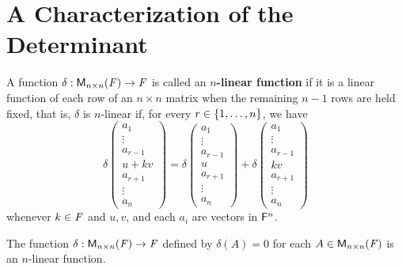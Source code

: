 \section{A Characterization of the Determinant}\label{sec:4.5}

\begin{defn}\label{4.5.1}
  A function \(\delta : \mathsf{M}_{{n} \times n}({\mathit{F}}) \to \mathit{F}\) is called an \textbf{\(n\)-linear function} if it is a linear function of each row of an \(n \times n\) matrix when the remaining \(n - 1\) rows are held fixed, that is, \(\delta\) is \(n\)-linear if, for every \(r \in \left\lbrace1, \dots, n\right\rbrace\), we have
  \[
    \delta\begin{pmatrix}
      a_1       \\
      \vdots    \\
      a_{r - 1} \\
      u + kv    \\
      a_{r + 1} \\
      \vdots    \\
      a_n
    \end{pmatrix} = \delta\begin{pmatrix}
      a_1       \\
      \vdots    \\
      a_{r - 1} \\
      u         \\
      a_{r + 1} \\
      \vdots    \\
      a_n
    \end{pmatrix} + \delta\begin{pmatrix}
      a_1       \\
      \vdots    \\
      a_{r - 1} \\
      kv        \\
      a_{r + 1} \\
      \vdots    \\
      a_n
    \end{pmatrix}
  \]
  whenever \(k \in \mathit{F}\) and \(u, v\), and each \(a_i\) are vectors in \(\mathsf{F}^n\).
\end{defn}

\begin{eg}\label{4.5.2}
  The function \(\delta : \mathsf{M}_{{n} \times n}({\mathit{F}}) \to \mathit{F}\) defined by \(\delta(A) = 0\) for each \(A \in \mathsf{M}_{{n} \times n}({\mathit{F}})\) is an \(n\)-linear function.
\end{eg}

